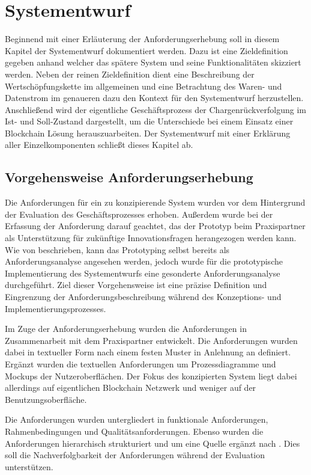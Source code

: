 \section{Systementwurf} \label{sec:system-design}
Beginnend mit einer Erläuterung der Anforderungserhebung soll in diesem Kapitel der Systementwurf dokumentiert werden. Dazu ist eine Zieldefinition gegeben anhand welcher das spätere System und seine Funktionalitäten skizziert werden. Neben der reinen Zieldefinition dient eine Beschreibung der Wertschöpfungskette im allgemeinen und eine Betrachtung des Waren- und Datenstrom im genaueren dazu den Kontext für den Systementwurf herzustellen. Anschließend wird der eigentliche Geschäftsprozess der Chargenrückverfolgung im Ist- und Soll-Zustand dargestellt, um die Unterschiede bei einem Einsatz einer Blockchain Lösung herauszuarbeiten. Der Systementwurf mit einer Erklärung aller Einzelkomponenten schließt dieses Kapitel ab.

\subsection{Vorgehensweise Anforderungserhebung}
Die Anforderungen für ein zu konzipierende System wurden vor dem Hintergrund der Evaluation des Geschäftsprozesses erhoben. Außerdem wurde bei der Erfassung der Anforderung darauf geachtet, das der Prototyp beim Praxispartner als Unterstützung für zukünftige Innovationsfragen herangezogen werden kann. Wie von \citet{Dick2017, HullElizabeth2011} beschrieben, kann das Prototyping selbst bereits als Anforderungsanalyse angesehen werden, jedoch wurde für die prototypische Implementierung des Systementwurfs eine gesonderte Anforderungsanalyse durchgeführt. Ziel dieser Vorgehensweise ist eine präzise Definition und Eingrenzung der Anforderungsbeschreibung während des Konzeptions- und Implementierungsprozesses.

Im Zuge der Anforderungserhebung wurden die Anforderungen in Zusammenarbeit mit dem Praxispartner entwickelt. Die Anforderungen wurden dabei in textueller Form nach einem festen Muster in Anlehnung an \citet{PohlKlaus2015} definiert. Ergänzt wurden die textuellen Anforderungen um Prozessdiagramme und Mockups der Nutzeroberflächen. Der Fokus des konzipierten System liegt dabei allerdings auf eigentlichen Blockchain Netzwerk und weniger auf der Benutzungsoberfläche.

Die Anforderungen wurden untergliedert in funktionale Anforderungen, Rahmenbedingungen und Qualitätsanforderungen. Ebenso wurden die Anforderungen hierarchisch strukturiert und um eine Quelle ergänzt nach \citet{Koelsch2016}. Dies soll die Nachverfolgbarkeit der Anforderungen während der Evaluation unterstützen.

